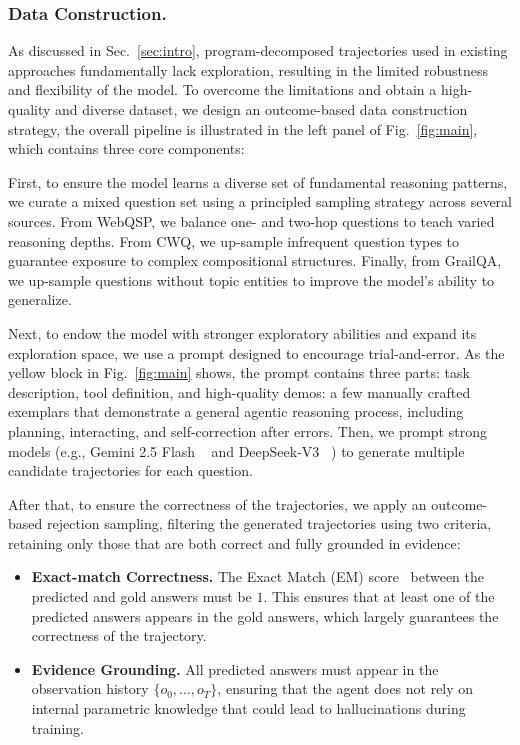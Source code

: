 \subsubsection{Data Construction.} 
As discussed in Sec.~\ref{sec:intro}, program-decomposed trajectories used in existing approaches fundamentally lack exploration, resulting in the limited robustness and flexibility of the model. 
To overcome the limitations and obtain a high-quality and diverse dataset, we design an outcome-based data construction strategy, the overall pipeline is illustrated in the left panel of Fig.~\ref{fig:main}, which contains three core components:

First, to ensure the model learns a diverse set of fundamental reasoning patterns, we curate a mixed question set using a principled sampling strategy across several sources. From WebQSP, we balance one- and two-hop questions to teach varied reasoning depths. From CWQ, we up-sample infrequent question types to guarantee exposure to complex compositional structures. Finally, from GrailQA, we up-sample questions without topic entities to improve the model's ability to generalize.

Next, to endow the model with stronger exploratory abilities and expand its exploration space, we use a prompt designed to encourage trial-and-error. As the yellow block in Fig.~\ref{fig:main} shows, the prompt contains three parts: task description, tool definition, and high-quality demos: a few manually crafted exemplars that demonstrate a general agentic reasoning process, including planning, interacting, and self-correction after errors. Then, we prompt strong models (e.g., Gemini 2.5 Flash  ~\citep{comanici2025gemini} and DeepSeek-V3  ~\citep{guo2025deepseek}) to generate multiple candidate trajectories for each question.

After that, to ensure the correctness of the trajectories, we apply an outcome-based rejection sampling, filtering the generated trajectories using two criteria, retaining only those that are both correct and fully grounded in evidence:
\begin{itemize}
\item \textbf{Exact-match Correctness.} The Exact Match (EM) score~\citep{talmor2018web} between the predicted and gold answers must be $1$. This ensures that at least one of the predicted answers appears in the gold answers, which largely guarantees the correctness of the trajectory.
\item \textbf{Evidence Grounding.} All predicted answers must appear in the observation history $\{o_0,\ldots,o_T\}$, ensuring that the agent does not rely on internal parametric knowledge that could lead to hallucinations during training.
\end{itemize}

